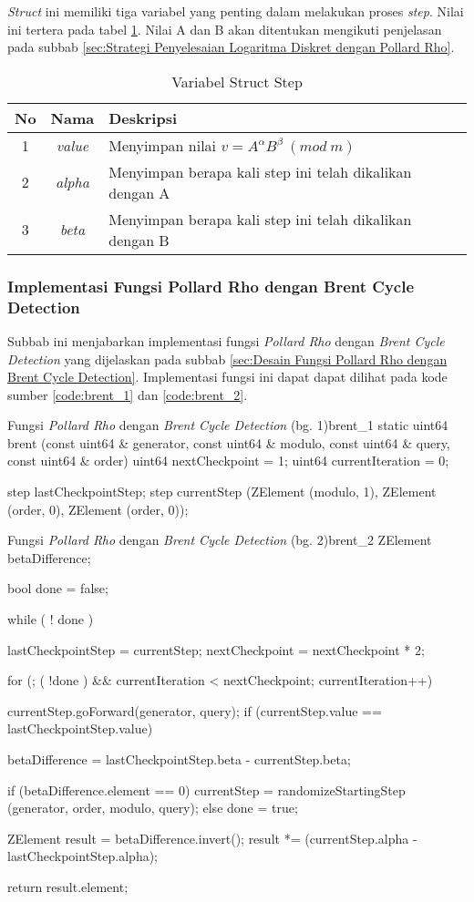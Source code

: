 \textit{Struct} ini memiliki tiga variabel yang penting dalam melakukan proses \textit{step}. Nilai ini tertera pada tabel \ref{tab:var_step}. Nilai A dan B akan ditentukan mengikuti penjelasan pada subbab \ref{sec:Strategi Penyelesaian Logaritma Diskret dengan Pollard Rho}.

\begin{table}[h!]
\caption{Variabel Struct Step}
\label{tab:var_step}
\begin{tabularx}{\linewidth}{ |c|c|X| }
\hline
No	&Nama	&Deskripsi \\
\hline
1	&\textit{value}	&Menyimpan nilai $ v=A^{\alpha} B^{\beta}\ (mod\ m) $ \\
2	&\textit{alpha}	&Menyimpan berapa kali step ini telah dikalikan dengan A \\
3	&\textit{beta}	&Menyimpan berapa kali step ini telah dikalikan dengan B \\
\hline
\end{tabularx}
\end{table}

\subsubsection{Implementasi Fungsi Pollard Rho dengan Brent Cycle Detection}

Subbab ini menjabarkan implementasi fungsi \textit{Pollard Rho} dengan \textit{Brent Cycle Detection} yang dijelaskan pada subbab \ref{sec:Desain Fungsi Pollard Rho dengan Brent Cycle Detection}. Implementasi fungsi ini dapat dapat dilihat pada kode sumber \ref{code:brent_1} dan \ref{code:brent_2}.
\begin{code}[firstnumber=0]{Fungsi \textit{Pollard Rho} dengan \textit{Brent Cycle Detection} (bg. 1)}{brent_1}
static uint64 brent (const uint64 & generator, const uint64 & modulo, const uint64 & query, const uint64 & order)
uint64 nextCheckpoint = 1;
uint64 currentIteration = 0;

step lastCheckpointStep;
step currentStep (ZElement (modulo, 1), ZElement (order, 0), ZElement (order, 0));
\end{code}
\begin{code}[firstnumber=last]{Fungsi \textit{Pollard Rho} dengan \textit{Brent Cycle Detection} (bg. 2)}{brent_2}
ZElement betaDifference;

bool done = false;

while ( ! done )
{
	lastCheckpointStep = currentStep;
	nextCheckpoint = nextCheckpoint * 2;
	
	for (; ( !done ) && currentIteration < nextCheckpoint; currentIteration++)
	{
		currentStep.goForward(generator, query);
		if (currentStep.value == lastCheckpointStep.value)
		{
			betaDifference = lastCheckpointStep.beta - currentStep.beta;

			if (betaDifference.element == 0)
			{
				currentStep = randomizeStartingStep (generator, order, modulo, query);
			}
			else
			{
				done = true;
			}
		}
	}
}

ZElement result = betaDifference.invert();
result *= (currentStep.alpha - lastCheckpointStep.alpha);

return result.element;
\end{code}

